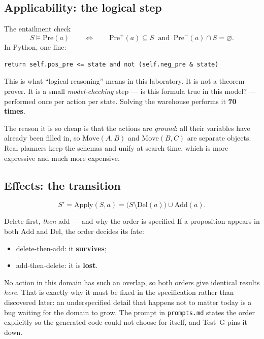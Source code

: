 \documentclass[11pt,a4paper]{article}
\newcommand{\ent}{\models}
\begin{document}
\subsection{Applicability: the logical step}

\begin{keyidea}{The entailment check}
\[
  S \ent \mathrm{Pre}(a)
  \qquad\Longleftrightarrow\qquad
  \mathrm{Pre}^{+}(a) \subseteq S
  \ \text{ and }\
  \mathrm{Pre}^{-}(a) \cap S = \varnothing .
\]
In Python, one line:
\begin{lstlisting}
return self.pos_pre <= state and not (self.neg_pre & state)
\end{lstlisting}
\end{keyidea}

This is what ``logical reasoning'' means in this laboratory. It is not a theorem
prover. It is a small \emph{model-checking} step --- is this formula true in
this model? --- performed once per action per state. Solving the warehouse
performs it \textbf{70 times}.

The reason it is so cheap is that the actions are \emph{ground}: all their
variables have already been filled in, so $\mathrm{Move}(A,B)$ and
$\mathrm{Move}(B,C)$ are separate objects. Real planners keep the schemas and
unify at search time, which is more expressive and much more expensive.

\subsection{Effects: the transition}

\[
  S' = \mathrm{Apply}(S, a) = \bigl(S \setminus \mathrm{Del}(a)\bigr) \cup \mathrm{Add}(a).
\]

\begin{warnbox}{Delete first, \emph{then} add --- and why the order is specified}
If a proposition appears in both $\mathrm{Add}$ and $\mathrm{Del}$, the order
decides its fate:
\begin{itemize}
  \item delete-then-add: it \textbf{survives};
  \item add-then-delete: it is \textbf{lost}.
\end{itemize}
No action in this domain has such an overlap, so both orders give identical
results \emph{here}. That is exactly why it must be fixed in the specification
rather than discovered later: an underspecified detail that happens not to
matter today is a bug waiting for the domain to grow. The prompt in
\texttt{prompts.md} states the order explicitly so the generated code could not
choose for itself, and Test~G pins it down.
\end{warnbox}
\end{document}
